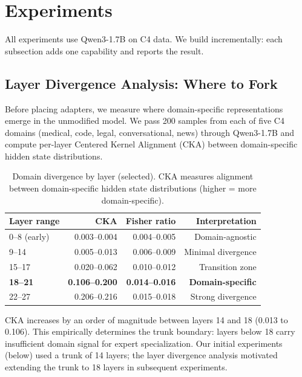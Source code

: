 \documentclass{article}
\begin{document}
\section{Experiments}
\label{sec:experiments}

All experiments use Qwen3-1.7B on C4 data. We build incrementally: each
subsection adds one capability and reports the result.

\subsection{Layer Divergence Analysis: Where to Fork}
\label{sec:divergence}

Before placing adapters, we measure where domain-specific representations
emerge in the unmodified model. We pass 200 samples from each of five C4
domains (medical, code, legal, conversational, news) through Qwen3-1.7B and
compute per-layer Centered Kernel Alignment (CKA) between domain-specific
hidden state distributions.

\begin{table}[h]
\centering
\caption{Domain divergence by layer (selected). CKA measures alignment between
domain-specific hidden state distributions (higher = more domain-specific).}
\label{tab:divergence}
\begin{tabular}{@{}lrrr@{}}
\toprule
Layer range & CKA & Fisher ratio & Interpretation \\
\midrule
0--8 (early) & 0.003--0.004 & 0.004--0.005 & Domain-agnostic \\
9--14        & 0.005--0.013 & 0.006--0.009 & Minimal divergence \\
15--17       & 0.020--0.062 & 0.010--0.012 & Transition zone \\
\textbf{18--21} & \textbf{0.106--0.200} & \textbf{0.014--0.016} & \textbf{Domain-specific} \\
22--27       & 0.206--0.216 & 0.015--0.018 & Strong divergence \\
\bottomrule
\end{tabular}
\end{table}

CKA increases by an order of magnitude between layers 14 and 18 (0.013 to
0.106). This empirically determines the trunk boundary: layers below 18 carry
insufficient domain signal for expert specialization. Our initial experiments
(below) used a trunk of 14 layers;
the layer divergence analysis motivated extending the trunk to 18 layers in
subsequent experiments.
\end{document}
